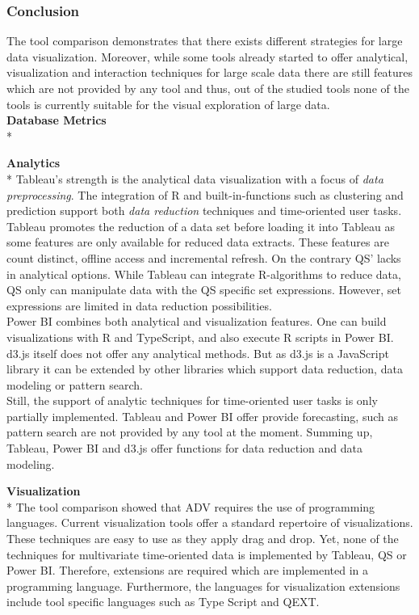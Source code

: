 \subsubsection{Conclusion}\label{conclusion}
The tool comparison demonstrates that there exists different strategies for large data visualization. Moreover, while some tools already started to offer analytical, visualization and interaction techniques for large scale data there are still features which are not provided by any tool and thus, out of the studied tools none of the tools is currently suitable for the visual exploration of large data.\\
\textbf{Database Metrics}\\*
\par
\textbf{Analytics}\\*
Tableau's strength is the analytical data visualization with a focus of \textit{data preprocessing}. The integration of R and built-in-functions such as clustering and prediction support both \textit{data reduction} techniques and time-oriented user tasks. Tableau  promotes the reduction of a data set before loading it into Tableau as some features are only available for reduced data extracts. These features are count distinct, offline access and incremental refresh. 
On the contrary QS' lacks in analytical options. While Tableau can integrate R-algorithms to reduce data, QS only can manipulate data with the QS specific set expressions. However, set expressions are limited in data reduction possibilities.\\
Power BI combines both analytical and visualization features. One can build visualizations with R and TypeScript, and also execute R scripts in Power BI. \\
d3.js itself does not offer any analytical methods. But as d3.js is a JavaScript library it can be extended by other libraries which support data reduction, data modeling or pattern search.\\
Still, the support of analytic techniques for time-oriented user tasks is only partially implemented. Tableau and Power BI offer provide forecasting,  such as pattern search are not provided by any tool at the moment. 
Summing up, Tableau, Power BI and d3.js offer functions for data reduction and data modeling.
\par
\textbf{Visualization}\\*
The tool comparison showed that ADV requires the use of programming languages. Current visualization tools offer a standard repertoire of visualizations. These techniques are easy to use as they apply drag and drop. Yet, none of the techniques for multivariate time-oriented data is implemented by Tableau, QS or Power BI. Therefore, extensions are required which are implemented in a programming language. Furthermore, the languages for visualization extensions include tool specific languages such as Type Script and QEXT.\\
